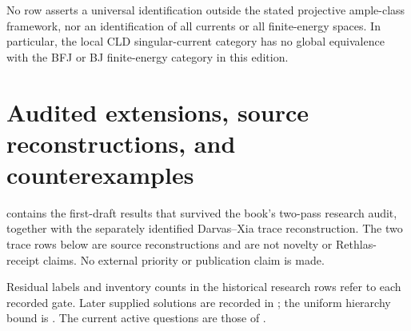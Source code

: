 No row asserts a universal identification outside the stated projective
ample-class framework, nor an identification of all currents or all
finite-energy spaces.  In particular, the local CLD
singular-current category has no global equivalence with the BFJ or BJ
finite-energy category in this edition.

\section{Audited extensions, source reconstructions, and counterexamples}
\label{sec:appL-new}

 contains the first-draft results that survived
the book's two-pass research audit, together with the separately identified
Darvas--Xia trace reconstruction.  The two trace rows below are source
reconstructions and are not novelty or Rethlas-receipt claims.  No external
priority or publication claim is made.

Residual labels and inventory counts in the historical research rows refer
to each recorded gate. Later supplied solutions are recorded in
; the uniform hierarchy bound is
. The current active questions are those
of .


